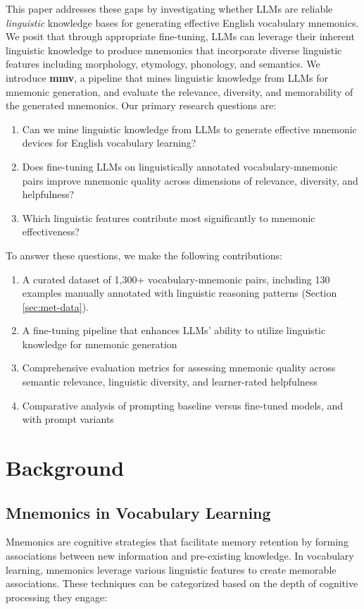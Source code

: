 \documentclass{article}
\newcounter{para}
\newcommand{\shorttitle}{\textbf{mmv}}
\begin{document}
This paper addresses these gaps by investigating whether LLMs are reliable \emph{linguistic} knowledge bases for generating effective English vocabulary mnemonics. We posit that through appropriate fine-tuning, LLMs can leverage their inherent linguistic knowledge to produce mnemonics that incorporate diverse linguistic features including morphology, etymology, phonology, and semantics. We introduce \shorttitle, a pipeline that mines linguistic knowledge from LLMs for mnemonic generation, and evaluate the relevance, diversity, and memorability of the generated mnemonics.
Our primary research questions are:
\begin{enumerate}
\item Can we mine linguistic knowledge from LLMs to generate effective mnemonic devices for English vocabulary learning?
\item Does fine-tuning LLMs on linguistically annotated vocabulary-mnemonic pairs improve mnemonic quality across dimensions of relevance, diversity, and helpfulness?
\item Which linguistic features contribute most significantly to mnemonic effectiveness?
\end{enumerate}
To answer these questions, we make the following contributions:
\begin{enumerate}
\item A curated dataset of 1,300+ vocabulary-mnemonic pairs, including 130 examples manually annotated with linguistic reasoning patterns (Section \ref{sec:met-data}).
\item A fine-tuning pipeline that enhances LLMs' ability to utilize linguistic knowledge for mnemonic generation
\item Comprehensive evaluation metrics for assessing mnemonic quality across semantic relevance, linguistic diversity, and learner-rated helpfulness
\item Comparative analysis of prompting baseline versus fine-tuned models, and with prompt variants
\end{enumerate}

\section{Background} \label{sec:background}
\subsection{Mnemonics in Vocabulary Learning} \label{sec:mnemonics}
Mnemonics are cognitive strategies that facilitate memory retention by forming associations between new information and pre-existing knowledge. In vocabulary learning, mnemonics leverage various linguistic features to create memorable associations. These techniques can be categorized based on the depth of cognitive processing they engage:
\end{document}
